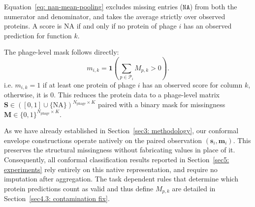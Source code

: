 Equation~\eqref{eq: nan-mean-pooling} excludes missing entries ($\texttt{NA}$) from both the numerator and denominator, 
and takes the average strictly over observed proteins. A score is $\mathrm{NA}$ if and only if no protein of phage $i$ 
has an observed prediction for function $k$.


The phage-level mask follows directly:
\begin{equation}
\label{eq: phage-mask}
m_{i,k} = \mathbf{1}\left( \sum_{p \in \mathcal{P}_i} M_{p,k} > 0 \right).
\end{equation}
i.e. $m_{i,k}=1$ if at least one protein of phage $i$ has an observed score for column $k$, otherwise, it is $0$. This reduces 
the protein data to a phage-level matrix $\mathbf{S} \in ([0,1]\cup\{\text{NA}\})^{N_{\text{phage}} \times K}$ paired with a 
binary mask for missingness $\mathbf{M} \in \{0,1\}^{N_{\text{phage}} \times K}$.

As we have already established in Section~\ref{sec3: methodology}, our conformal envelope constructions operate 
natively on the paired observation $(\mathbf{s}_i, \mathbf{m}_i)$.  This preserves the structural missingness without 
fabricating values in place of it. Consequently, all conformal classification results reported in Section~\ref{sec5: experiments} 
rely entirely on this native representation, and require no imputation after aggregation. The task dependent rules that determine 
which protein predictions count as valid and thus define $M_{p,k}$ are detailed in Section~\ref{sec4.3: contamination fix}.